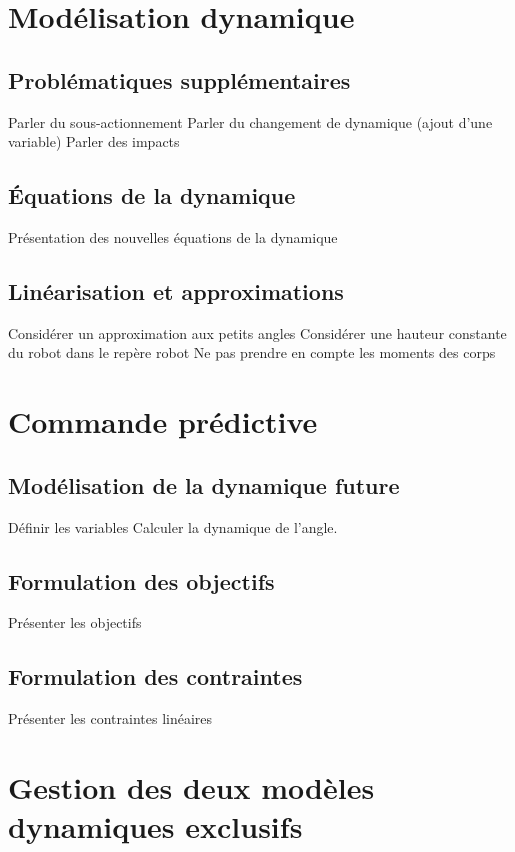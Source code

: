 \section{Modélisation dynamique}
\subsection{Problématiques supplémentaires}

Parler du sous-actionnement
Parler du changement de dynamique (ajout d'une variable)
Parler des impacts

\subsection{Équations de la dynamique}

Présentation des nouvelles équations de la dynamique

\subsection{Linéarisation et approximations}

Considérer un approximation aux petits angles
Considérer une hauteur constante du robot dans le repère robot
Ne pas prendre en compte les moments des corps

\section{Commande prédictive}
\subsection{Modélisation de la dynamique future}

Définir les variables
Calculer la dynamique de l'angle.

\subsection{Formulation des objectifs}

Présenter les objectifs

\subsection{Formulation des contraintes}

Présenter les contraintes linéaires

\section{Gestion des deux modèles dynamiques exclusifs}
